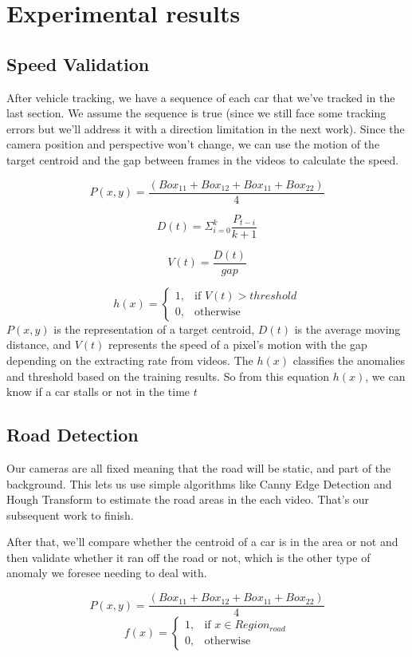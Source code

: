 \documentclass[10pt,twocolumn,letterpaper]{article}
\begin{document}
\section{Experimental results}
\subsection{Speed Validation}

After vehicle tracking, we have a sequence of each car that we've tracked in the last section. We assume the sequence is true (since we still face some tracking errors but we'll address it with a direction limitation in the next work). Since the camera position and perspective won't change, we can use the motion of the target centroid and the gap between frames in the videos to calculate the speed.

$$P(x, y) = \frac{(Box_{11} +  Box_{12} + Box_{11} +  Box_{22})}{4}$$

$$D(t) = \Sigma_{i=0}^{k}\frac{P_{t-i}}{k+1}$$

$$V(t) = \frac{D(t)}{gap}$$

\[
    h(x)= 
\begin{cases}
    1,& \text{if } V(t) > threshold\\
    0,              & \text{otherwise}
\end{cases}
\]
$P(x,y)$ is the representation of a target centroid, $D(t)$ is the average moving distance, and $V(t)$ represents the speed of a pixel's motion with the gap depending on the extracting rate from videos. The $h(x)$ classifies the anomalies and threshold based on the training results. So from this equation $h(x)$, we can know if a car stalls or not in the time $t$


\subsection{Road Detection}

Our cameras are all fixed meaning that the road will be static, and part of the background. This lets us use simple algorithms like Canny Edge Detection and Hough Transform to estimate the road areas in the each video. That's our subsequent work to finish.

After that, we'll compare whether the centroid of a car is in the area or not and then validate whether it ran off the road or not, which is the other type of anomaly we foresee needing to deal with. 

$$P(x, y) = \frac{(Box_{11} +  Box_{12} + Box_{11} +  Box_{22})}{4}$$
\[
    f(x)= 
\begin{cases}
    1,& \text{if } x\in Region_{road}\\
    0,              & \text{otherwise}
\end{cases}
\]
\end{document}
